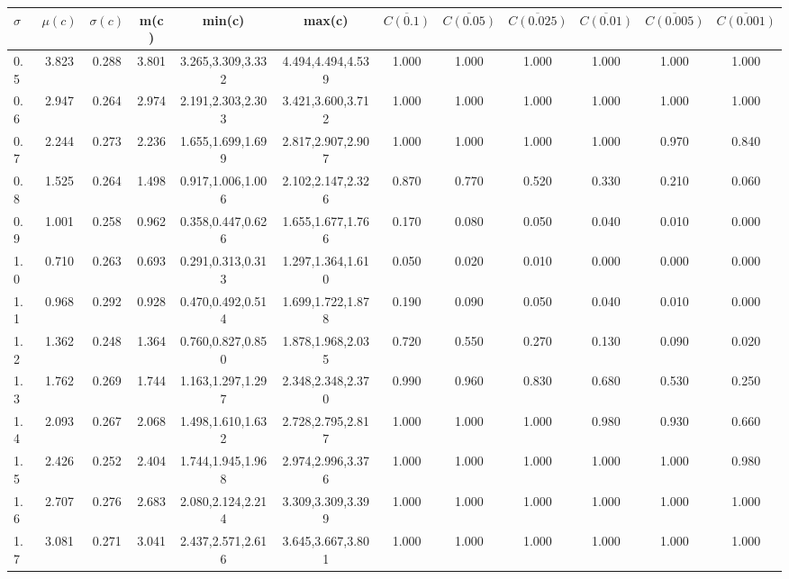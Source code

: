 \begin{table*}[h!]
\begin{center}
\begin{tabular}{| l | c | c | c | c | c | c | c | c | c | c | c |}\hline
$\sigma$ & $\mu(c)$ & $\sigma(c)$ & m(c) & min(c) & max(c) & $\overline{C(0.1)}$ & $\overline{C(0.05)}$ & $\overline{C(0.025)}$ & $\overline{C(0.01)}$ & $\overline{C(0.005)}$ & $\overline{C(0.001)}$ \\\hline
0.5 & 3.823 & 0.288 & 3.801 & 3.265,3.309,3.332 & 4.494,4.494,4.539  & 1.000  & 1.000  & 1.000  & 1.000  & 1.000  & 1.000 \\\hline
0.6 & 2.947 & 0.264 & 2.974 & 2.191,2.303,2.303 & 3.421,3.600,3.712  & 1.000  & 1.000  & 1.000  & 1.000  & 1.000  & 1.000 \\\hline
0.7 & 2.244 & 0.273 & 2.236 & 1.655,1.699,1.699 & 2.817,2.907,2.907  & 1.000  & 1.000  & 1.000  & 1.000  & 0.970  & 0.840 \\\hline
0.8 & 1.525 & 0.264 & 1.498 & 0.917,1.006,1.006 & 2.102,2.147,2.326  & 0.870  & 0.770  & 0.520  & 0.330  & 0.210  & 0.060 \\\hline
0.9 & 1.001 & 0.258 & 0.962 & 0.358,0.447,0.626 & 1.655,1.677,1.766  & 0.170  & 0.080  & 0.050  & 0.040  & 0.010  & 0.000 \\\hline
1.0 & 0.710 & 0.263 & 0.693 & 0.291,0.313,0.313 & 1.297,1.364,1.610  & 0.050  & 0.020  & 0.010  & 0.000  & 0.000  & 0.000 \\\hline
1.1 & 0.968 & 0.292 & 0.928 & 0.470,0.492,0.514 & 1.699,1.722,1.878  & 0.190  & 0.090  & 0.050  & 0.040  & 0.010  & 0.000 \\\hline
1.2 & 1.362 & 0.248 & 1.364 & 0.760,0.827,0.850 & 1.878,1.968,2.035  & 0.720  & 0.550  & 0.270  & 0.130  & 0.090  & 0.020 \\\hline
1.3 & 1.762 & 0.269 & 1.744 & 1.163,1.297,1.297 & 2.348,2.348,2.370  & 0.990  & 0.960  & 0.830  & 0.680  & 0.530  & 0.250 \\\hline
1.4 & 2.093 & 0.267 & 2.068 & 1.498,1.610,1.632 & 2.728,2.795,2.817  & 1.000  & 1.000  & 1.000  & 0.980  & 0.930  & 0.660 \\\hline
1.5 & 2.426 & 0.252 & 2.404 & 1.744,1.945,1.968 & 2.974,2.996,3.376  & 1.000  & 1.000  & 1.000  & 1.000  & 1.000  & 0.980 \\\hline
1.6 & 2.707 & 0.276 & 2.683 & 2.080,2.124,2.214 & 3.309,3.309,3.399  & 1.000  & 1.000  & 1.000  & 1.000  & 1.000  & 1.000 \\\hline
1.7 & 3.081 & 0.271 & 3.041 & 2.437,2.571,2.616 & 3.645,3.667,3.801  & 1.000  & 1.000  & 1.000  & 1.000  & 1.000  & 1.000 \\\hline

\end{tabular}
\end{center}
\end{table*}

